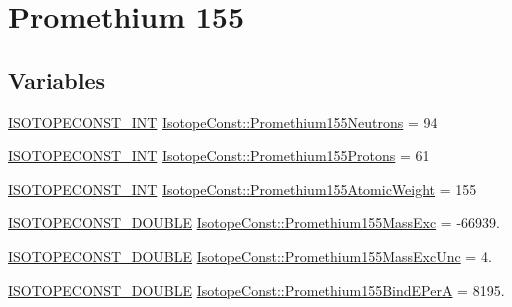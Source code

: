 \hypertarget{group___isotope_const-_promethium-_pm155}{}\section{Promethium 155}
\label{group___isotope_const-_promethium-_pm155}
\subsection*{Variables}
\begin{DoxyCompactItemize}
\item 
\mbox{\hyperlink{group___isotope_const-_macros_ga5f18360b3e99483a35c32d789e62621c}{I\+S\+O\+T\+O\+P\+E\+C\+O\+N\+S\+T\+\_\+\+I\+NT}} \mbox{\hyperlink{group___isotope_const-_promethium-_pm155_ga1b808cb52ec4c88371c93604744b48da}{Isotope\+Const\+::\+Promethium155\+Neutrons}} = 94
\item 
\mbox{\hyperlink{group___isotope_const-_macros_ga5f18360b3e99483a35c32d789e62621c}{I\+S\+O\+T\+O\+P\+E\+C\+O\+N\+S\+T\+\_\+\+I\+NT}} \mbox{\hyperlink{group___isotope_const-_promethium-_pm155_gae672f00dd0c76a309d0f17f1df9eac30}{Isotope\+Const\+::\+Promethium155\+Protons}} = 61
\item 
\mbox{\hyperlink{group___isotope_const-_macros_ga5f18360b3e99483a35c32d789e62621c}{I\+S\+O\+T\+O\+P\+E\+C\+O\+N\+S\+T\+\_\+\+I\+NT}} \mbox{\hyperlink{group___isotope_const-_promethium-_pm155_gae6dc8dc7620e5a96e40cfdab7eaea619}{Isotope\+Const\+::\+Promethium155\+Atomic\+Weight}} = 155
\item 
\mbox{\hyperlink{group___isotope_const-_macros_ga8f45a7272ce02c0b4c65c44636ed719a}{I\+S\+O\+T\+O\+P\+E\+C\+O\+N\+S\+T\+\_\+\+D\+O\+U\+B\+LE}} \mbox{\hyperlink{group___isotope_const-_promethium-_pm155_ga0c1a214833b3f430b8cf740907eb4eae}{Isotope\+Const\+::\+Promethium155\+Mass\+Exc}} = -\/66939.
\item 
\mbox{\hyperlink{group___isotope_const-_macros_ga8f45a7272ce02c0b4c65c44636ed719a}{I\+S\+O\+T\+O\+P\+E\+C\+O\+N\+S\+T\+\_\+\+D\+O\+U\+B\+LE}} \mbox{\hyperlink{group___isotope_const-_promethium-_pm155_ga2c8ec4b6781c7313bedbd82e29f7c6e3}{Isotope\+Const\+::\+Promethium155\+Mass\+Exc\+Unc}} = 4.
\item 
\mbox{\hyperlink{group___isotope_const-_macros_ga8f45a7272ce02c0b4c65c44636ed719a}{I\+S\+O\+T\+O\+P\+E\+C\+O\+N\+S\+T\+\_\+\+D\+O\+U\+B\+LE}} \mbox{\hyperlink{group___isotope_const-_promethium-_pm155_gae12331573d0d438972be487c0c8f3135}{Isotope\+Const\+::\+Promethium155\+Bind\+E\+PerA}} = 8195.

\end{DoxyCompactItemize}
